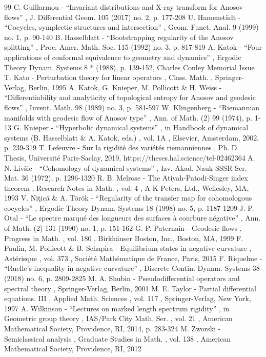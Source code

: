 \documentclass[10pt]{amsart}
\theoremstyle{plain}
\theoremstyle{definition}
\begin{document}
\begin{thebibliography}{99}
 C. Guillarmou - “Invariant distributions and X-ray transform for Anosov flows” , J. Differential Geom. 105 (2017) no. 2, p. 177-208
 U. Hamenstädt - “Cocycles, symplectic structures and intersection” , Geom. Funct. Anal. 9 (1999) no. 1, p. 90-140
 B. Hasselblatt - “Bootstrapping regularity of the Anosov splitting” , Proc. Amer. Math. Soc. 115 (1992) no. 3, p. 817-819
 A. Katok - “Four applications of conformal equivalence to geometry and dynamics” , Ergodic Theory Dynam. Systems 8 * (1988), p. 139-152, Charles Conley Memorial Issue
 T. Kato - Perturbation theory for linear operators , Class. Math. , Springer-Verlag, Berlin, 1995
 A. Katok, G. Knieper, M. Pollicott \& H. Weiss - “Differentiability and analyticity of topological entropy for Anosov and geodesic flows” , Invent. Math. 98 (1989) no. 3, p. 581-597
 W. Klingenberg - “Riemannian manifolds with geodesic flow of Anosov type” , Ann. of Math. (2) 99 (1974), p. 1-13
 G. Knieper - “Hyperbolic dynamical systems” , in Handbook of dynamical systems (B. Hasselblatt \& A. Katok, eds.) , vol. 1A , Elsevier, Amsterdam, 2002, p. 239-319
 T. Lefeuvre - Sur la rigidité des variétés riemanniennes , Ph. D. Thesis, Université Paris-Saclay, 2019, https://theses.hal.science/tel-02462364
 A. N. Livšic - “Cohomology of dynamical systems” , Izv. Akad. Nauk SSSR Ser. Mat. 36 (1972), p. 1296-1320
 R. B. Melrose - The Atiyah-Patodi-Singer index theorem , Research Notes in Math. , vol. 4 , A K Peters, Ltd., Wellesley, MA, 1993
 V. Niţică \& A. Török - “Regularity of the transfer map for cohomologous cocycles” , Ergodic Theory Dynam. Systems 18 (1998) no. 5, p. 1187-1209
 J.-P. Otal - “Le spectre marqué des longueurs des surfaces à courbure négative” , Ann. of Math. (2) 131 (1990) no. 1, p. 151-162
 G. P. Paternain - Geodesic flows , Progress in Math. , vol. 180 , Birkhäuser Boston, Inc., Boston, MA, 1999
 F. Paulin, M. Pollicott \& B. Schapira - Equilibrium states in negative curvature , Astérisque , vol. 373 , Société Mathématique de France, Paris, 2015
 F. Riquelme - “Ruelle’s inequality in negative curvature” , Discrete Contin. Dynam. Systems 38 (2018) no. 6, p. 2809-2825
 M. A. Shubin - Pseudodifferential operators and spectral theory , Springer-Verlag, Berlin, 2001
 M. E. Taylor - Partial differential equations. III , Applied Math. Sciences , vol. 117 , Springer-Verlag, New York, 1997
 A. Wilkinson - “Lectures on marked length spectrum rigidity” , in Geometric group theory , IAS/Park City Math. Ser. , vol. 21 , American Mathematical Society, Providence, RI, 2014, p. 283-324
 M. Zworski - Semiclassical analysis , Graduate Studies in Math. , vol. 138 , American Mathematical Society, Providence, RI, 2012
\end{thebibliography}
\end{document}
